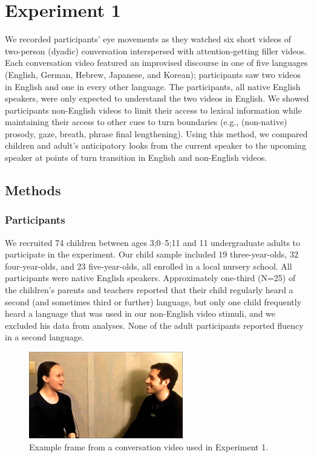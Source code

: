 \documentclass[authoryear, 12pt]{elsarticle}
\begin{document}
\section{Experiment 1}
\label{sec:exp1}

We recorded participants' eye movements as they watched six short videos of two-person (dyadic) conversation interspersed with attention-getting filler videos. Each conversation video featured an improvised discourse in one of five languages (English, German, Hebrew, Japanese, and Korean); participants saw two videos in English and one in every other language. The participants, all native English speakers, were only expected to understand the two videos in English. We showed participants non-English videos to limit their access to lexical information while maintaining their access to other cues to turn boundaries (e.g., (non-native) prosody, gaze, breath, phrase final lengthening). Using this method, we compared children and adult's anticipatory looks from the current speaker to the upcoming speaker at points of turn transition in English and non-English videos.

\subsection{Methods}
\label{sec:methods1}

\subsubsection{Participants}

We recruited 74 children between ages 3;0--5;11 and 11 undergraduate adults to participate in the experiment. Our child sample included 19 three-year-olds, 32 four-year-olds, and 23 five-year-olds, all enrolled in a local nursery school. All participants were native English speakers. Approximately one-third (N=25) of the children's parents and teachers reported that their child regularly heard a second (and sometimes third or further) language, but only one child frequently heard a language that was used in our non-English video stimuli, and we excluded his data from analyses. None of the adult participants reported fluency in a second language.

\begin{figure}[t]
\begin{center}
\includegraphics[width=0.6\textwidth]{figures/FIG-FL-stim.png}
\end{center}
\caption{Example frame from a conversation video used in Experiment 1.} 
\label{fig:speakers}
\end{figure}
\end{document}
